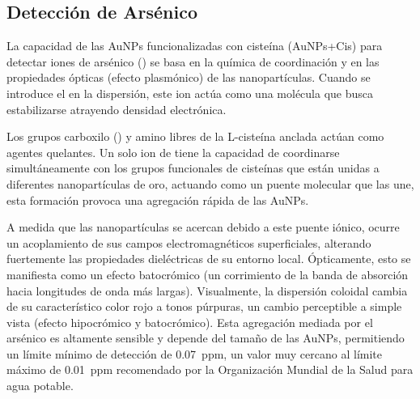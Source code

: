 \subsection{Detección de Arsénico}
La capacidad de las AuNPs funcionalizadas con cisteína (AuNPs+Cis) para detectar
iones de arsénico () se basa en la química de coordinación y en las
propiedades ópticas (efecto plasmónico) de las nanopartículas. Cuando se
introduce el  en la dispersión, este ion actúa como una molécula que
busca estabilizarse atrayendo densidad electrónica.

Los grupos carboxilo () y amino libres de la L-cisteína anclada actúan
como agentes quelantes. Un solo ion de  tiene la capacidad de
coordinarse simultáneamente con los grupos funcionales de cisteínas que están
unidas a diferentes nanopartículas de oro, actuando como un puente molecular
que las une, esta formación  provoca una agregación rápida de las AuNPs.

A medida que las nanopartículas se acercan debido a este puente iónico, ocurre
un acoplamiento de sus campos electromagnéticos superficiales, alterando
fuertemente las propiedades dieléctricas de su entorno local. Ópticamente, esto
se manifiesta como un efecto batocrómico (un corrimiento de la banda de absorción
hacia longitudes de onda más largas). Visualmente, la dispersión coloidal cambia
de su característico color rojo a tonos púrpuras, un cambio perceptible a simple
vista (efecto hipocrómico y batocrómico). Esta agregación mediada por el arsénico
es altamente sensible y depende del tamaño de las AuNPs, permitiendo un límite
mínimo de detección de \qty{0.07}{ppm}, un valor muy cercano al límite máximo de
\qty{0.01}{ppm} recomendado por la Organización Mundial de la Salud para agua
potable.
